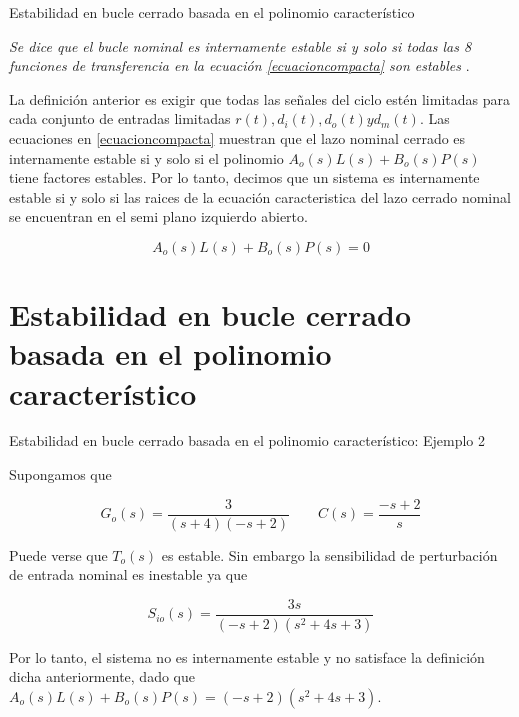 \documentclass{beamer}
\begin{document}
\begin{frame}{Estabilidad en bucle cerrado basada en el polinomio característico}
\begin{justify}
\textit{Se dice que el bucle nominal es internamente estable si y solo si todas las 8 funciones de transferencia en la ecuación \ref{ecuacioncompacta} son estables }. 

\vspace{0.3cm}
La definición anterior es exigir que todas las señales del ciclo estén limitadas para cada conjunto de entradas limitadas $r(t), d_i(t), d_o(t) y d_m(t)$. Las ecuaciones en \ref{ecuacioncompacta} muestran que el lazo nominal cerrado es internamente estable si y solo si el polinomio $A_o(s)L(s)+B_o(s)P(s)$ tiene factores estables. Por lo tanto, decimos que un sistema es internamente estable si y solo si las raices de la ecuación caracteristica del lazo cerrado nominal se encuentran en el semi plano izquierdo abierto.

\begin{equation}\label{ecua-caracteristica}
    A_o(s)L(s)+B_o(s)P(s)=0
\end{equation}


\end{justify}
\end{frame}

\section{Estabilidad en bucle cerrado basada en el polinomio característico}
\begin{frame}{Estabilidad en bucle cerrado basada en el polinomio característico: Ejemplo 2}
\begin{justify}
Supongamos que

\[G_o(s)=\frac{3}{(s+4)(-s+2)} \qquad C(s)=\frac{-s+2}{s}\]

\vspace{0.3cm}
Puede verse que $T_o(s)$ es estable. Sin embargo la sensibilidad de perturbación de entrada nominal es inestable ya que

\[S_{io}(s)=\frac{3s}{(-s+2)(s^2+4s+3)}\]

\vspace{0.3cm}
Por lo tanto, el sistema no es internamente estable y no satisface la definición dicha anteriormente, dado que $A_o(s)L(s)+B_o(s)P(s)=(-s+2)(s^2+4s+3)$.

\end{justify}
\end{frame}
\end{document}
